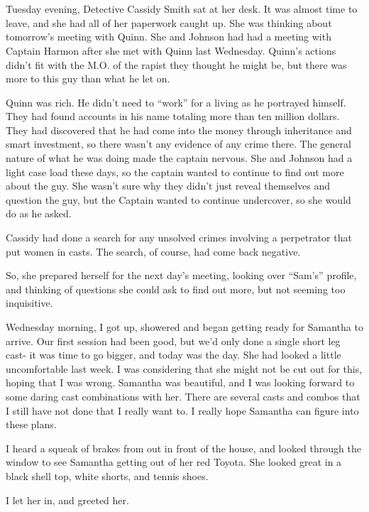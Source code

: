 \chapter{~}
Tuesday evening, Detective Cassidy Smith sat at her desk. It was almost time to leave, and
she had all of her paperwork caught up. She was thinking about tomorrow's meeting with Quinn.
She and Johnson had had a meeting with Captain Harmon after she met with Quinn last Wednesday.
Quinn's actions didn't fit with the M.O. of the rapist they thought he might be, but there was
more to this guy than what he let on.

Quinn was rich. He didn't need to ``work'' for a living as he portrayed himself. They had
found accounts in his name totaling more than ten million dollars. They had discovered that he
had come into the money through inheritance and smart investment, so there wasn't any evidence
of any crime there. The general nature of what he was doing made the captain nervous. She and
Johnson had a light case load these days, so the captain wanted to continue to find out more
about the guy. She wasn't sure why they didn't just reveal themselves and question the guy, but
the Captain wanted to continue undercover, so she would do as he asked.

Cassidy had done a search for any unsolved crimes involving a perpetrator that put women
in casts. The search, of course, had come back negative.

So, she prepared herself for the next day's meeting, looking over ``Sam's'' profile, and
thinking of questions she could ask to find out more, but not seeming too inquisitive.

Wednesday morning, I got up, showered and began getting ready for Samantha to arrive. Our
first session had been good, but we'd only done a single short leg cast- it was time to go
bigger, and today was the day. She had looked a little uncomfortable last week. I was
considering that she might not be cut out for this, hoping that I was wrong. Samantha was
beautiful, and I was looking forward to some daring cast combinations with her. There are
several casts and combos that I still have not done that I really want to. I really hope
Samantha can figure into these plans.

I heard a squeak of brakes from out in front of the house, and looked through the window to
see Samantha getting out of her red Toyota. She looked great in a black shell top, white shorts,
and tennis shoes.

I let her in, and greeted her.

